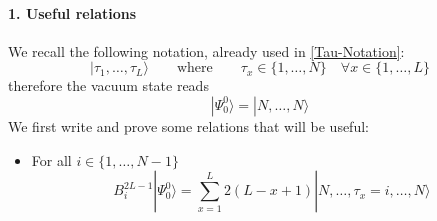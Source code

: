 \documentclass[10pt]{article}
\numberwithin{equation}{section}
\numberwithin{equation}{subsection}
\begin{document}
\paragraph{1. Useful relations}
We recall the following notation, already used in \eqref{Tau-Notation}:
\begin{equation}
	|\tau_{1},\ldots,\tau_{L}\rangle\qquad \text{where}\qquad \tau_{x}\in\{1,\ldots,N\}\quad \forall x\in \{1,\ldots,L\}
\end{equation}
therefore the vacuum state reads
\begin{equation}
	|\Psi_{0}^{0}\rangle=|N,\ldots,N\rangle
\end{equation}
We first write and prove some relations that will be useful:
\begin{itemize}
	\item For all $i\in\{1,\ldots,N-1\}$
	\begin{equation}\label{BActionVoid}
		B_{i}^{2L-1}|\Psi_{0}^{0}\rangle=\sum_{x=1}^{L}2(L-x+1)|N,\ldots,\tau_{x}=i,\ldots,N\rangle
	\end{equation}


\end{itemize}
\end{document}

